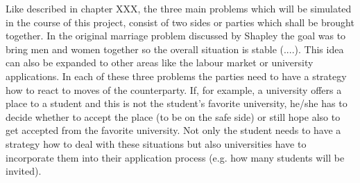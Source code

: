 Like described in chapter XXX, the three main problems which will be simulated in the course of this project, consist of two sides or parties which shall be brought together. In the original marriage problem discussed by Shapley the goal was to bring men and women together so the overall situation is stable (....). This idea can also be expanded to other areas like the labour market or university applications. In each of these three problems the parties need to have a strategy how to react to moves of the counterparty. If, for example, a university offers a place to a student and this is not the student's favorite university,  he/she has to decide whether to accept the place (to be on the safe side) or still hope also to get accepted from the favorite university. Not only the student needs to have a strategy how to deal with these situations but also universities have to incorporate them into their application process (e.g. how many students will be invited).
